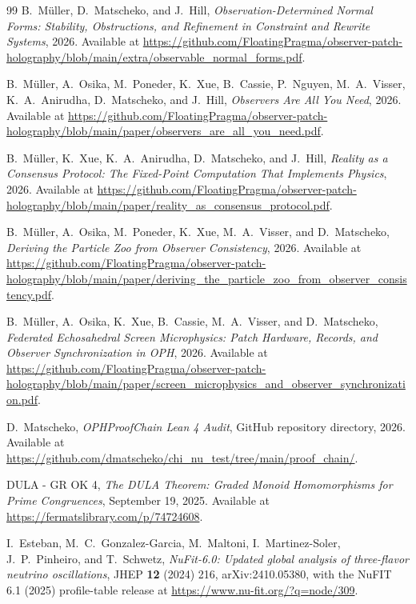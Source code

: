 \documentclass[11pt]{article}
\begin{document}
\begin{thebibliography}{99}
B.~M\"uller, D.~Matscheko, and J.~Hill,
\emph{Observation-Determined Normal Forms: Stability, Obstructions, and Refinement in Constraint and Rewrite Systems},
2026.
Available at \url{https://github.com/FloatingPragma/observer-patch-holography/blob/main/extra/observable_normal_forms.pdf}.

B.~M\"uller, A.~Osika, M.~Poneder, K.~Xue, B.~Cassie, P.~Nguyen, M.~A.~Visser, K.~A.~Anirudha, D.~Matscheko, and J.~Hill,
\emph{Observers Are All You Need},
2026.
Available at \url{https://github.com/FloatingPragma/observer-patch-holography/blob/main/paper/observers_are_all_you_need.pdf}.

B.~M\"uller, K.~Xue, K.~A.~Anirudha, D.~Matscheko, and J.~Hill,
\emph{Reality as a Consensus Protocol: The Fixed-Point Computation That Implements Physics},
2026.
Available at \url{https://github.com/FloatingPragma/observer-patch-holography/blob/main/paper/reality_as_consensus_protocol.pdf}.

B.~M\"uller, A.~Osika, M.~Poneder, K.~Xue, M.~A.~Visser, and D.~Matscheko,
\emph{Deriving the Particle Zoo from Observer Consistency},
2026.
Available at \url{https://github.com/FloatingPragma/observer-patch-holography/blob/main/paper/deriving_the_particle_zoo_from_observer_consistency.pdf}.

B.~M\"uller, A.~Osika, K.~Xue, B.~Cassie, M.~A.~Visser, and D.~Matscheko,
\emph{Federated Echosahedral Screen Microphysics: Patch Hardware, Records, and Observer Synchronization in OPH},
2026.
Available at \url{https://github.com/FloatingPragma/observer-patch-holography/blob/main/paper/screen_microphysics_and_observer_synchronization.pdf}.

D.~Matscheko,
\emph{OPHProofChain Lean 4 Audit},
GitHub repository directory, 2026.
Available at \url{https://github.com/dmatscheko/chi_nu_test/tree/main/proof_chain/}.

DULA - GR OK 4,
\emph{The DULA Theorem: Graded Monoid Homomorphisms for Prime Congruences},
September 19, 2025.
Available at \url{https://fermatslibrary.com/p/74724608}.

I.~Esteban, M.~C.~Gonzalez-Garcia, M.~Maltoni, I.~Martinez-Soler, J.~P.~Pinheiro, and T.~Schwetz,
\emph{NuFit-6.0: Updated global analysis of three-flavor neutrino oscillations},
JHEP \textbf{12} (2024) 216, arXiv:2410.05380,
with the NuFIT 6.1 (2025) profile-table release at \url{https://www.nu-fit.org/?q=node/309}.


\end{thebibliography}
\end{document}
